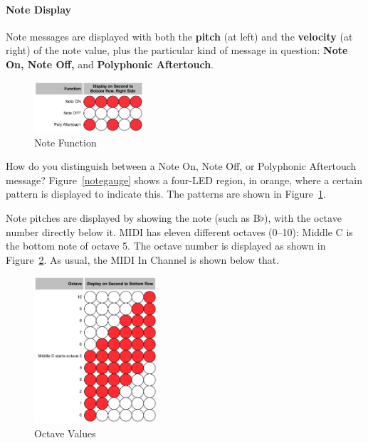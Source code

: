 \documentclass{article}
\begin{document}
\paragraph{Note Display}

Note messages are displayed with both the {\bf pitch} (at left) and the {\bf velocity} (at right) of the note value, plus the particular kind of message in question: {\bf Note On, Note Off,} and {\bf Polyphonic Aftertouch}.

\begin{figure}
\vspace{-1em}\includegraphics[width=1.6in]{notefunction.pdf}
\vspace{-2em}\caption{\small Note Function}\vspace{-2em}
\label{notefunction}
\end{figure}

How do you distinguish between a Note On, Note Off, or Polyphonic Aftertouch message?  Figure~\ref{notegauge} shows a four-LED region, in orange, where a certain pattern is displayed to indicate this.  The patterns are shown in Figure~\ref{notefunction}.

Note pitches are displayed by showing the note (such as B$\flat$), with the octave number directly below it.  MIDI has eleven different octaves (0--10): Middle C is the bottom note of octave 5.  The octave number is displayed as shown in Figure~\ref{octave}.  As usual, the MIDI In Channel is shown below that.


\begin{figure}
\includegraphics[width=1.8in]{octave.pdf}
\vspace{-2em}\caption{\small Octave Values}\vspace{-5em}
\label{octave}
\end{figure}
\end{document}
